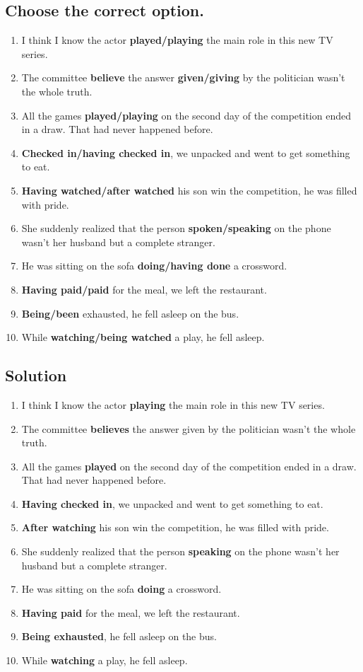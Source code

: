 \subsection*{Choose the correct option.}
\begin{enumerate}
      \item I think I know the actor \textbf{played/playing} the main role in this new TV series.
      \item The committee \textbf{believe} the answer \textbf{given/giving} by the politician wasn't the whole truth.
      \item All the games \textbf{played/playing} on the second day of the competition ended in a draw. That had never happened before.
      \item \textbf{Checked in/having checked in}, we unpacked and went to get something to eat.
      \item \textbf{Having watched/after watched} his son win the competition, he was filled with pride.
      \item She suddenly realized that the person \textbf{spoken/speaking} on the phone wasn't her husband but a complete stranger.
      \item He was sitting on the sofa \textbf{doing/having done} a crossword.
      \item \textbf{Having paid/paid} for the meal, we left the restaurant.
      \item \textbf{Being/been} exhausted, he fell asleep on the bus.
      \item While \textbf{watching/being watched} a play, he fell asleep.
\end{enumerate}

\subsection*{Solution}
\begin{enumerate}
      \item I think I know the actor \textbf{playing} the main role in this new TV series.
      \item The committee \textbf{believes} the answer given by the politician wasn't the whole truth.
      \item All the games \textbf{played} on the second day of the competition ended in a draw. That had never happened before.
      \item \textbf{Having checked in}, we unpacked and went to get something to eat.
      \item \textbf{After watching} his son win the competition, he was filled with pride.
      \item She suddenly realized that the person \textbf{speaking} on the phone wasn't her husband but a complete stranger.
      \item He was sitting on the sofa \textbf{doing} a crossword.
      \item \textbf{Having paid} for the meal, we left the restaurant.
      \item \textbf{Being exhausted}, he fell asleep on the bus.
      \item While \textbf{watching} a play, he fell asleep.
\end{enumerate}

